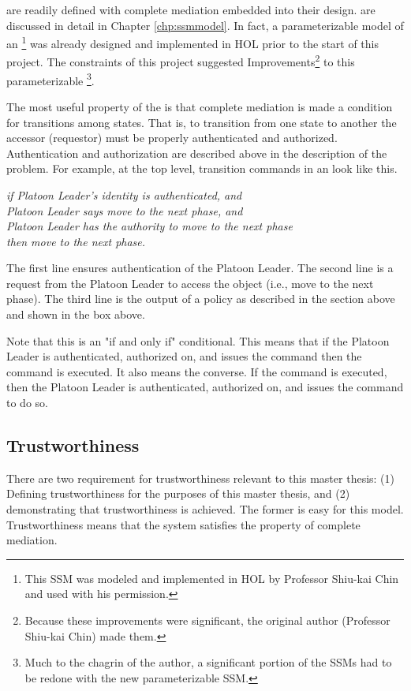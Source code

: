 \documentclass[../../main/main.tex]{subfiles}
\begin{document}
 are readily defined with complete mediation embedded into their design.   are discussed in detail in Chapter \ref{chp:ssmmodel}.  In fact, a parameterizable model of an \footnote{This SSM was modeled and implemented in HOL by Professor Shiu-kai Chin and used with his permission.} was already designed and implemented in HOL prior to the start of this project.  The constraints of this project suggested Improvements\footnote{Because these improvements were significant, the original author (Professor Shiu-kai Chin) made them.} to this parameterizable \footnote{Much to the chagrin of the author, a significant portion of the SSMs had to be redone with the new parameterizable SSM.}.

The most useful property of the  is that complete mediation is made a condition for transitions among states.  That is, to transition from one state to another the accessor (requestor) must be properly authenticated and authorized. Authentication and authorization are described above in the description of the problem.   For example, at the top level, transition commands in an  look like this.

\begin{center}
\textit{if Platoon Leader's identity is authenticated, and\\
         Platoon Leader says move to the next phase, and \\
         Platoon Leader has the authority to move to the next phase\\
         then move to the next phase.}
\end{center}

The first line ensures authentication of the Platoon Leader.  The second line is a request from the Platoon Leader to access the object (i.e., move to the next phase).  The third line is the output of a policy as described in the section above and shown in the box above. 

Note that this is an "if and only if" conditional.  This means that if the Platoon Leader is authenticated, authorized on, and issues the command then the command is executed.  It also means the converse.  If the command is executed, then the Platoon Leader is authenticated, authorized on, and issues the command to do so.  

\subsection{Trustworthiness}
There are two requirement for trustworthiness relevant to this master thesis: (1) Defining trustworthiness for the purposes of this master thesis, and (2) demonstrating that trustworthiness is achieved.  The former is easy for this model.  Trustworthiness means that the system satisfies the property of complete mediation.  
\end{document}
